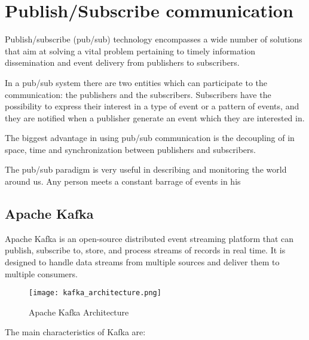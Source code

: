 

\chapter{Publish/Subscribe communication}

Publish/subscribe (pub/sub) technology encompasses a wide number of solutions
that aim at solving a vital problem pertaining to timely information
dissemination and event delivery from publishers to subscribers.
\cite{Pub/Sub_pattern}

In a pub/sub system there are two entities which can participate to the
communication: the publishers and the subscribers.
Subscribers have the possibility to express their interest in a type of event
or a pattern of events, and they are notified when a publisher generate an event
which they are interested in.

The biggest advantage in using pub/sub communication is the decoupling of
in space, time and synchronization between publishers and subscribers.
\cite{Many_faces_of_pub/sub}

The pub/sub paradigm is very useful in describing and monitoring the world
around us. Any person meets a constant barrage of events in his 


\section{Apache Kafka}

Apache Kafka is an open-source distributed event streaming platform that can
publish, subscribe to, store, and process streams of records in real time.
It is designed to handle data streams from multiple sources and deliver them to
multiple consumers. \cite{garg2013apache}

\begin{figure}[ht]
    \centering
    \texttt{[image: kafka\_architecture.png]}
    \caption{Apache Kafka Architecture}
\end{figure}

The main characteristics of Kafka are:

